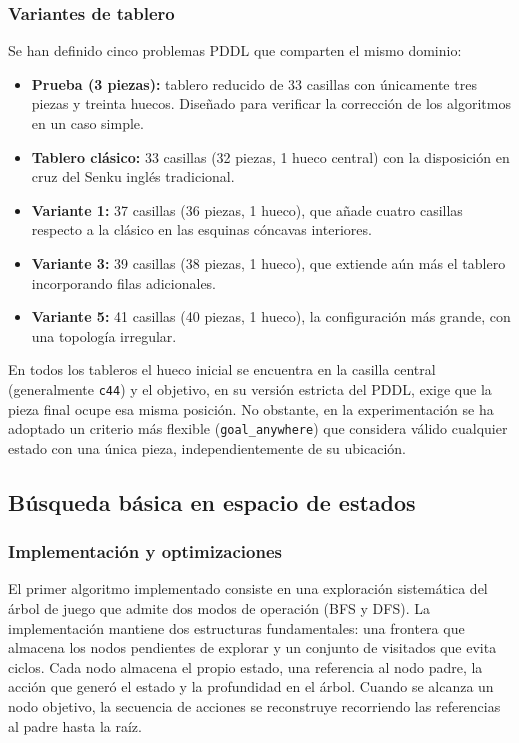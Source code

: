\documentclass[conference,a4paper]{IEEEtran}
\begin{document}
\subsubsection{Variantes de tablero}

Se han definido cinco problemas PDDL que comparten el mismo dominio:
\begin{itemize}
  \item \textbf{Prueba (3 piezas):} tablero reducido de 33 casillas con
    únicamente tres piezas y treinta huecos. Diseñado para verificar la
    corrección de los algoritmos en un caso simple.
  \item \textbf{Tablero clásico:} 33 casillas (32 piezas, 1 hueco central) con
    la disposición en cruz del Senku inglés tradicional.
  \item \textbf{Variante 1:} 37 casillas (36 piezas, 1 hueco), que añade
    cuatro casillas respecto a la clásico en las esquinas cóncavas interiores.
  \item \textbf{Variante 3:} 39 casillas (38 piezas, 1 hueco), que extiende
    aún más el tablero incorporando filas adicionales.
  \item \textbf{Variante 5:} 41 casillas (40 piezas, 1 hueco), la
    configuración más grande, con una topología irregular.
\end{itemize}
En todos los tableros el hueco inicial se encuentra en la casilla central
(generalmente \texttt{c44}) y el objetivo, en su versión estricta del PDDL, exige que la
pieza final ocupe esa misma posición. No obstante, en la experimentación se
ha adoptado un criterio más flexible (\texttt{goal\_anywhere}) que considera
válido cualquier estado con una única pieza, independientemente de su
ubicación.

\subsection{Búsqueda básica en espacio de estados}

\subsubsection{Implementación y optimizaciones}

El primer algoritmo implementado consiste en una exploración sistemática del
árbol de juego que admite dos modos de operación (BFS y DFS). La
implementación mantiene dos estructuras fundamentales: una frontera que
almacena los nodos pendientes de explorar y un conjunto de visitados que
evita ciclos. Cada nodo almacena el propio estado, una referencia al nodo
padre, la acción que generó el estado y la profundidad en el árbol. Cuando se
alcanza un nodo objetivo, la secuencia de acciones se reconstruye recorriendo
las referencias al padre hasta la raíz.
\end{document}
